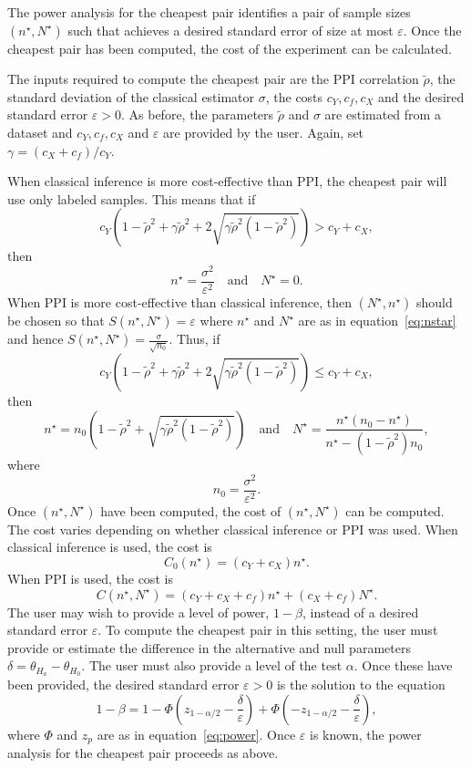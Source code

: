 The power analysis for the cheapest pair identifies a pair of sample sizes $(n^\star, N^\star)$ such that achieves a desired standard error of size at most $\varepsilon$. Once the cheapest pair has been computed, the cost of the experiment can be calculated.

The inputs required to compute the cheapest pair are the PPI correlation $\tilde{\rho}$, the standard deviation of the classical estimator $\sigma$, the costs $c_Y,c_f,c_X$ and the desired standard error $\varepsilon > 0$. As before, the parameters $\tilde{\rho}$  and $\sigma$ are estimated from a dataset and $c_Y,c_f,c_X$ and $\varepsilon$ are provided by the user. Again, set $\gamma = (c_X+c_f)/c_Y$.

When classical inference is more cost-effective than PPI, the cheapest pair will use only labeled samples. This means that if
\[
   c_Y \left(1-\tilde{\rho}^2 + \gamma\tilde{\rho}^2 +2\sqrt{\gamma \tilde{\rho}^2(1-\tilde{\rho}^2)} \right) > c_Y+c_X,
\]
then
\[ 
    n^\star = \frac{\sigma^2}{\varepsilon^2} \quad \text{and} \quad N^\star = 0.
\]
When PPI is more cost-effective than classical inference, then $(N^\star, n^\star)$ should be chosen so that $S(n^\star, N^\star) = \varepsilon$ where $n^\star$ and $N^\star$ are as in equation~\eqref{eq:nstar} and hence $S(n^\star, N^\star) = \frac{\sigma}{\sqrt{n_0}}$. Thus, if
\[
    c_Y \left(1-\tilde{\rho}^2 + \gamma\tilde{\rho}^2 +2\sqrt{\gamma \tilde{\rho}^2(1-\tilde{\rho}^2)} \right) \le c_Y+c_X,
\] then 
\[
     n^\star = n_0\left(1-\tilde{\rho}^2+\sqrt{\gamma \tilde{\rho}^2(1-\tilde{\rho}^2)}\right)\quad \text{and} \quad N^\star =   \frac{n^\star(n_0-n^\star)}{n^\star - (1-\tilde{\rho}^2)n_0},
\]
where 
\[
    n_0 = \frac{\sigma^2}{\varepsilon^2}.
\]
Once $(n^\star, N^\star)$ have been computed, the cost of $(n^\star, N^\star)$ can be computed. The cost varies depending on whether classical inference or PPI was used. When classical inference is used, the cost is
\[ 
    C_0(n^\star) = (c_Y+c_X)n^\star.
\]
When PPI is used, the cost is
\[
    C(n^\star, N^\star) = (c_Y+c_X+c_f)n^\star + (c_X+c_f)N^\star.
\]
The user may wish to provide a level of power, $1-\beta$, instead of a desired standard error $\varepsilon$. To compute the cheapest pair in this setting, the user must provide or estimate the difference in the alternative and null parameters $\delta=\theta_{H_a}-\theta_{H_0}$. The user must also provide a level of the test $\alpha$. Once these have been provided, the desired standard error $\varepsilon>0$ is the solution to the equation
\[
1-\beta = 1 - \Phi\left(z_{1-\alpha/2} - \frac{\delta}{\varepsilon}\right) + \Phi\left(-z_{1-\alpha/2}-\frac{\delta}{\varepsilon}\right),
\]
where $\Phi$ and $z_p$ are as in equation~\eqref{eq:power}. Once $\varepsilon$ is known, the power analysis for the cheapest pair proceeds as above.

